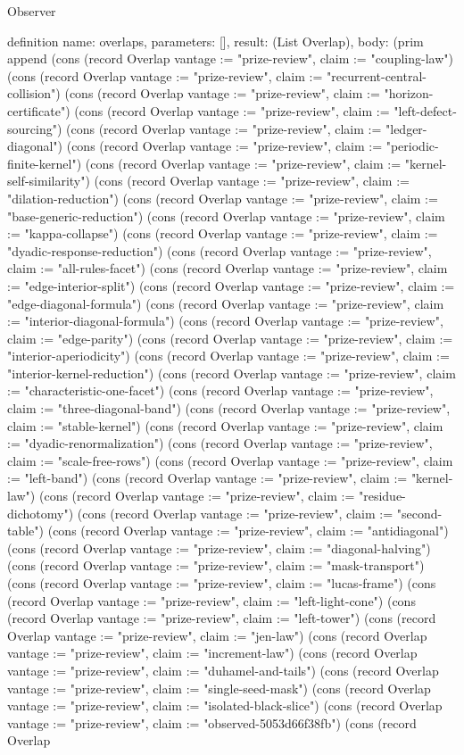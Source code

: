 \begin{lexlean}{Observer}
\begin{semanticmodule}
definition{
  name: overlaps,
  parameters: [],
  result: (List Overlap),
  body: (prim append (cons (record Overlap {vantage := "prize-review", claim := "coupling-law"}) (cons (record Overlap {vantage := "prize-review", claim := "recurrent-central-collision"}) (cons (record Overlap {vantage := "prize-review", claim := "horizon-certificate"}) (cons (record Overlap {vantage := "prize-review", claim := "left-defect-sourcing"}) (cons (record Overlap {vantage := "prize-review", claim := "ledger-diagonal"}) (cons (record Overlap {vantage := "prize-review", claim := "periodic-finite-kernel"}) (cons (record Overlap {vantage := "prize-review", claim := "kernel-self-similarity"}) (cons (record Overlap {vantage := "prize-review", claim := "dilation-reduction"}) (cons (record Overlap {vantage := "prize-review", claim := "base-generic-reduction"}) (cons (record Overlap {vantage := "prize-review", claim := "kappa-collapse"}) (cons (record Overlap {vantage := "prize-review", claim := "dyadic-response-reduction"}) (cons (record Overlap {vantage := "prize-review", claim := "all-rules-facet"}) (cons (record Overlap {vantage := "prize-review", claim := "edge-interior-split"}) (cons (record Overlap {vantage := "prize-review", claim := "edge-diagonal-formula"}) (cons (record Overlap {vantage := "prize-review", claim := "interior-diagonal-formula"}) (cons (record Overlap {vantage := "prize-review", claim := "edge-parity"}) (cons (record Overlap {vantage := "prize-review", claim := "interior-aperiodicity"}) (cons (record Overlap {vantage := "prize-review", claim := "interior-kernel-reduction"}) (cons (record Overlap {vantage := "prize-review", claim := "characteristic-one-facet"}) (cons (record Overlap {vantage := "prize-review", claim := "three-diagonal-band"}) (cons (record Overlap {vantage := "prize-review", claim := "stable-kernel"}) (cons (record Overlap {vantage := "prize-review", claim := "dyadic-renormalization"}) (cons (record Overlap {vantage := "prize-review", claim := "scale-free-rows"}) (cons (record Overlap {vantage := "prize-review", claim := "left-band"}) (cons (record Overlap {vantage := "prize-review", claim := "kernel-law"}) (cons (record Overlap {vantage := "prize-review", claim := "residue-dichotomy"}) (cons (record Overlap {vantage := "prize-review", claim := "second-table"}) (cons (record Overlap {vantage := "prize-review", claim := "antidiagonal"}) (cons (record Overlap {vantage := "prize-review", claim := "diagonal-halving"}) (cons (record Overlap {vantage := "prize-review", claim := "mask-transport"}) (cons (record Overlap {vantage := "prize-review", claim := "lucas-frame"}) (cons (record Overlap {vantage := "prize-review", claim := "left-light-cone"}) (cons (record Overlap {vantage := "prize-review", claim := "left-tower"}) (cons (record Overlap {vantage := "prize-review", claim := "jen-law"}) (cons (record Overlap {vantage := "prize-review", claim := "increment-law"}) (cons (record Overlap {vantage := "prize-review", claim := "duhamel-and-tails"}) (cons (record Overlap {vantage := "prize-review", claim := "single-seed-mask"}) (cons (record Overlap {vantage := "prize-review", claim := "isolated-black-slice"}) (cons (record Overlap {vantage := "prize-review", claim := "observed-5053d66f38fb"}) (cons (record Overlap }
\end{semanticmodule}
\end{lexlean}
